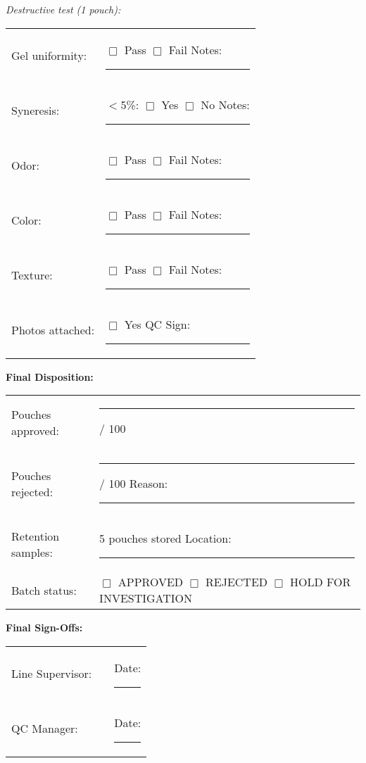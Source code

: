 {\vspace{0.5em}

\noindent\textit{Destructive test (1 pouch):}

\begin{tabular}{@{}lp{8cm}@{}}
Gel uniformity: & $\Box$ Pass $\Box$ Fail \hspace{2cm} Notes: \rule{5cm}{0.4pt} \\
Syneresis: & $<$5\%: $\Box$ Yes $\Box$ No \hspace{2cm} Notes: \rule{5cm}{0.4pt} \\
Odor: & $\Box$ 
Pass $\Box$ Fail \hspace{2cm} Notes: \rule{5cm}{0.4pt} \\
Color: & $\Box$ Pass $\Box$ Fail \hspace{2cm} Notes: \rule{5cm}{0.4pt} \\
Texture: & $\Box$ Pass $\Box$ Fail \hspace{2cm} Notes: \rule{5cm}{0.4pt} \\
Photos attached: & $\Box$ Yes \hspace{3cm} QC Sign: \rule{3cm}{0.4pt} \\
\end{tabular}

\vspace{1em}

\noindent\textbf{Final Disposition:}

\begin{tabular}{@{}lp{8cm}@{}}
Pouches approved: & \rule{3cm}{0.4pt} / 100 \\
Pouches rejected: & \rule{3cm}{0.4pt} / 100 \hspace{2cm} Reason: \rule{5cm}{0.4pt} \\
Retention samples: & 5 pouches stored \hspace{2cm} Location: \rule{4cm}{0.4pt} \\
Batch status: & $\Box$ APPROVED $\Box$ REJECTED $\Box$ HOLD FOR INVESTIGATION \\
\end{tabular}

\vspace{1em}

\noindent\textbf{Final Sign-Offs:}

\begin{tabular}{@{}lp{5cm}p{5cm}@{}}
Line Supervisor: & \rule{4cm}{0.4pt} & Date: \rule{3cm}{0.4pt} \\
QC Manager: & \rule{4cm}{0.4pt} & Date: \rule{3cm}{0.4pt} \\
\end{tabular}

}
